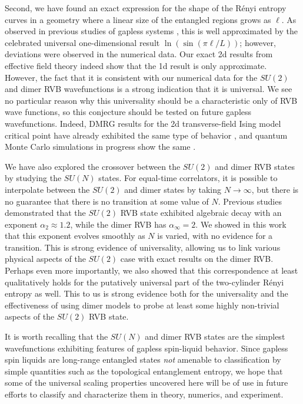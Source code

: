 \documentclass[11pt]{iopart}
\begin{document}
Second, we have found an exact expression for the shape of the R\'enyi entropy curves in a geometry where a linear size of the entangled regions grows as {$\ell$}.  As observed in previous studies of gapless systems \cite{Ju2012}, this is well approximated by the celebrated universal one-dimensional result {$\ln(\sin(\pi \ell /L))$}; however, deviations were observed in the numerical data.  {Our exact 2d results from effective field theory indeed show that the 1d result is only approximate}. However, the fact that it is consistent with our numerical data for the $SU(2)$ and dimer RVB wavefunctions is a strong indication that  it is universal. We see no particular reason why this universality should be a characteristic only of RVB wave functions, so this conjecture should be tested on future gapless wavefunctions.  Indeed, DMRG results for the 2d transverse-field Ising model critical point have already exhibited the same type of behavior \cite{Konik}, and quantum 
Monte Carlo simulations in progress show the same \cite{RogTFIM}.




We have also explored the crossover between the $SU(2)$ and dimer RVB states by studying the $SU(N)$ states. For equal-time correlators, it is possible to interpolate between the $SU(2)$ and dimer states by taking $N \rightarrow \infty$, but there is no guarantee that there is no transition at some value of $N$.  Previous studies demonstrated that the $SU(2)$ RVB state exhibited algebraic decay with an exponent $\alpha_2 \approx 1.2$, while the dimer RVB has $\alpha_{\infty} = 2$.  We showed in this work that this exponent evolves smoothly as $N$ is varied, with no evidence for a transition.  
This is strong evidence of universality, allowing us to link various physical aspects of the $SU(2)$ case with exact results on the dimer RVB. Perhaps even more importantly, we also showed that this correspondence at least qualitatively holds for the putatively universal part of the two-cylinder R\'enyi entropy as well. This to us is strong evidence both for the universality and the effectiveness of using dimer models to probe at least some {highly non-trivial} aspects of the $SU(2)$ RVB state.



It is worth recalling that the $SU(N)$ and dimer RVB states are the simplest wavefunctions exhibiting features of gapless spin-liquid behavior. Since gapless spin liquids are long-range entangled states {\it not} amenable to  classification by simple quantities such as the topological entanglement entropy, we hope that some of the universal scaling properties uncovered here will be of use in future efforts to classify and characterize them in theory, numerics, and experiment.
\end{document}
